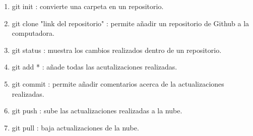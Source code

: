 \documentclass{article}
\begin{document}
\begin{enumerate}
\begin{enumerate}
\begin{enumerate}
			\end{enumerate}
			\item git init : convierte una carpeta en un repositorio.
			\item git clone "link del repositorio" : permite añadir un repositorio de Github a la computadora.
			\item git status : muestra los cambios realizados dentro de un repositorio.
			\item git add * : añade todas las acutalizaciones realizadas.
			\item git commit : permite añadir comentarios acerca de la actualizaciones realizadas.
			\item git push : sube las actualizaciones realizadas a la nube.
			\item git pull : baja actualizaciones de la nube.
		\end{enumerate}
	\end{enumerate}
\end{document}
